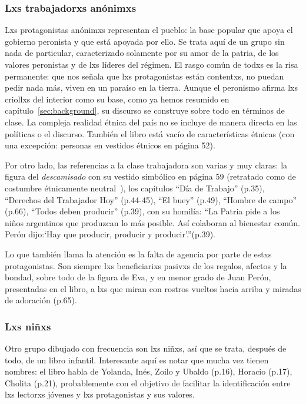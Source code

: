 \documentclass[
10pt, %
a4paper, %
oneside, %
headinclude,footinclude, %
]{scrartcl}
\begin{document}
\subsubsection{Lxs trabajadorxs anónimxs}
Lxs protagonistas anónimxs representan el pueblo: la base popular que apoya el gobierno peronista y que está apoyada por ello.
Se trata aquí de un grupo sin nada de particular, caracterizado solamente por su amor de la patria, de los valores peronistas y de lxs líderes del régimen.
El rasgo común de todxs es la risa permanente: que nos señala que lxs protagonistas están contentxs, no puedan pedir nada más, viven en un paraíso en la tierra.
Aunque el peronismo afirma lxs criollxs del interior como su base, como ya hemos resumido en capítulo~\ref{sec:background}, su discurso se construye sobre todo en términos de clase.
La compleja realidad étnica del país no se incluye de manera directa en las políticas o el discurso.
También el libro está vacío de características étnicas (con una excepción: personas en vestidos étnicos en página 52).

Por otro lado, las referencias a la clase trabajadora son varias y muy claras:
la figura del \textit{descamisado} con su vestido simbólico en página 59 (retratado como de costumbre étnicamente neutral~\autocite[p.125]{Chamosa2010}), los capítulos ``Día de Trabajo'' (p.35), ``Derechos del Trabajador Hoy'' (p.44-45), ``El buey'' (p.49), ``Hombre de campo'' (p.66), ``Todos deben producir'' (p.39),
con su homilía:
``La Patria pide a los niños argentinos que produzcan lo más posible. Así colaboran al bienestar común. Perón dijo:`Hay que producir, producir y producir'.''(p.39).

Lo que también llama la atención es la falta de agencia por parte de estxs protagonistas.
Son siempre lxs beneficiarixs pasivxs de los regalos, afectos y la bondad, sobre todo de la figura de Eva, y en menor grado de Juan Perón, presentadas en el libro, a lxs que miran con rostros vueltos hacia arriba y miradas de adoración (p.65).

\subsubsection{Lxs niñxs}
Otro grupo dibujado con frecuencia son lxs niñxs, así que se trata, después de todo, de un libro infantil.
Interesante aquí es notar que mucha vez tienen nombres: el libro habla de Yolanda, Inés, Zoilo y Ubaldo (p.16), Horacio (p.17), Cholita (p.21),
probablemente con el objetivo de facilitar la identificación entre lxs lectorxs jóvenes y lxs protagonistas y sus valores.
\end{document}
